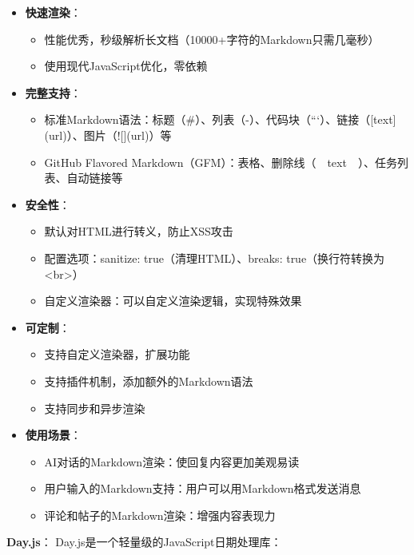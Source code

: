 \documentclass[12pt,a4paper]{article}
\begin{document}
\begin{itemize}
    \item \textbf{快速渲染}：
        \begin{itemize}
            \item 性能优秀，秒级解析长文档（10000+字符的Markdown只需几毫秒）
            \item 使用现代JavaScript优化，零依赖
        \end{itemize}
    \item \textbf{完整支持}：
        \begin{itemize}
            \item 标准Markdown语法：标题（\#）、列表（-）、代码块（```）、链接（[text](url)）、图片（![](url)）等
            \item GitHub Flavored Markdown（GFM）：表格、删除线（~~text~~）、任务列表、自动链接等
        \end{itemize}
    \item \textbf{安全性}：
        \begin{itemize}
            \item 默认对HTML进行转义，防止XSS攻击
            \item 配置选项：sanitize: true（清理HTML）、breaks: true（换行符转换为<br>）
            \item 自定义渲染器：可以自定义渲染逻辑，实现特殊效果
        \end{itemize}
    \item \textbf{可定制}：
        \begin{itemize}
            \item 支持自定义渲染器，扩展功能
            \item 支持插件机制，添加额外的Markdown语法
            \item 支持同步和异步渲染
        \end{itemize}
    \item \textbf{使用场景}：
        \begin{itemize}
            \item AI对话的Markdown渲染：使回复内容更加美观易读
            \item 用户输入的Markdown支持：用户可以用Markdown格式发送消息
            \item 评论和帖子的Markdown渲染：增强内容表现力
        \end{itemize}
\end{itemize}

\textbf{Day.js}：
Day.js是一个轻量级的JavaScript日期处理库：
\end{document}
